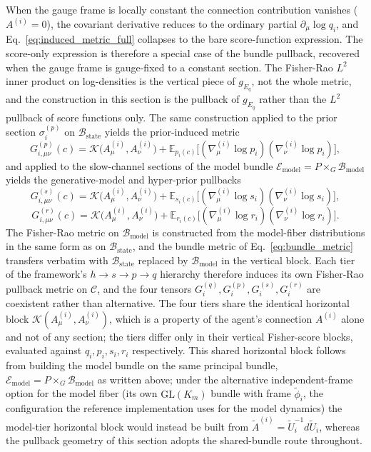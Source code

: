 \documentclass[11pt]{article}
\begin{document}
When the gauge frame is locally constant the connection contribution vanishes ($A^{(i)} = 0$), the covariant derivative reduces to the ordinary partial $\partial_\mu \log q_i$, and Eq.~\eqref{eq:induced_metric_full} collapses to the bare score-function expression. The score-only expression is therefore a special case of the bundle pullback, recovered when the gauge frame is gauge-fixed to a constant section. The Fisher-Rao $L^2$ inner product on log-densities is the vertical piece of $g_{E_q}$, not the whole metric, and the construction in this section is the pullback of $g_{E_q}$ rather than the $L^2$ pullback of score functions only. The same construction applied to the prior section $\sigma_i^{(p)}$ on $\mathcal{B}_{\mathrm{state}}$ yields the prior-induced metric
\begin{equation}
\boxed{G^{(p)}_{i,\mu\nu}(c) = \mathcal{K}\big(A^{(i)}_\mu, A^{(i)}_\nu\big) + \mathbb{E}_{p_i(c)}\big[(\nabla^{(i)}_\mu \log p_i)(\nabla^{(i)}_\nu \log p_i)\big],}
\end{equation}
and applied to the slow-channel sections of the model bundle $\mathcal{E}_{\mathrm{model}} = P \times_G \mathcal{B}_{\mathrm{model}}$ yields the generative-model and hyper-prior pullbacks
\begin{equation}
\boxed{G^{(s)}_{i,\mu\nu}(c) = \mathcal{K}\big(A^{(i)}_\mu, A^{(i)}_\nu\big) + \mathbb{E}_{s_i(c)}\big[(\nabla^{(i)}_\mu \log s_i)(\nabla^{(i)}_\nu \log s_i)\big],}
\end{equation}
\begin{equation}
G^{(r)}_{i,\mu\nu}(c) = \mathcal{K}\big(A^{(i)}_\mu, A^{(i)}_\nu\big) + \mathbb{E}_{r_i(c)}\big[(\nabla^{(i)}_\mu \log r_i)(\nabla^{(i)}_\nu \log r_i)\big].
\end{equation}
The Fisher-Rao metric on $\mathcal{B}_{\mathrm{model}}$ is constructed from the model-fiber distributions in the same form as on $\mathcal{B}_{\mathrm{state}}$, and the bundle metric of Eq.~\eqref{eq:bundle_metric} transfers verbatim with $\mathcal{B}_{\mathrm{state}}$ replaced by $\mathcal{B}_{\mathrm{model}}$ in the vertical block. Each tier of the framework's $h \to s \to p \to q$ hierarchy therefore induces its own Fisher-Rao pullback metric on $\mathcal{C}$, and the four tensors $G_i^{(q)}, G_i^{(p)}, G_i^{(s)}, G_i^{(r)}$ are coexistent rather than alternative. The four tiers share the identical horizontal block $\mathcal{K}(A^{(i)}_\mu, A^{(i)}_\nu)$, which is a property of the agent's connection $A^{(i)}$ alone and not of any section; the tiers differ only in their vertical Fisher-score blocks, evaluated against $q_i, p_i, s_i, r_i$ respectively. This shared horizontal block follows from building the model bundle on the same principal bundle, $\mathcal{E}_{\mathrm{model}} = P \times_G \mathcal{B}_{\mathrm{model}}$ as written above; under the alternative independent-frame option for the model fiber (its own $\mathrm{GL}(K_m)$ bundle with frame $\tilde{\phi}_i$, the configuration the reference implementation uses for the model dynamics) the model-tier horizontal block would instead be built from $\tilde{A}^{(i)} = \tilde{U}_i^{-1} d\tilde{U}_i$, whereas the pullback geometry of this section adopts the shared-bundle route throughout.
\end{document}
